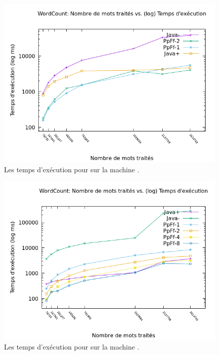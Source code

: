\begin{figure}
\centering
     \includegraphics[width=1.0\textwidth]{Figures/graphe_temps_Java_WordCount.png}
      \caption{Les temps d'ex\'ecution pour  sur la machine .}
       \label{GrapheTempsWordCountJava.fig}
\end{figure}

\begin{figure}
\centering
     \includegraphics[width=1.0\textwidth]{Figures/graphe_temps_Japet_WordCount.png}
      \caption{Les temps d'ex\'ecution pour  sur la machine .}
       \label{GrapheTempsWordCountJapet.fig}
\end{figure}

